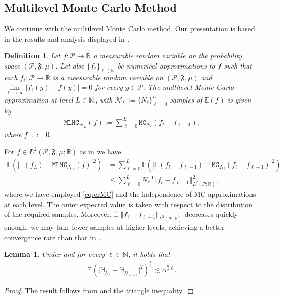 \documentclass{article}
\newtheorem{definition}[theorem]{Definition}
\newtheorem{lemma}[theorem]{Lemma}
\newcommand{\cG}{\mathcal{G}}
\newcommand{\cP}{\mathcal{P}}
\newcommand{\cN}{\mathcal{N}}
\newcommand{\fF}{\mathfrak{F}}
\newcommand{\IE}{\mathbb{E}}
\newcommand{\IH}{\mathbb{H}}
\newcommand{\IN}{\mathbb{N}}
\newcommand{\IR}{\mathbb{R}}
\newcommand{\norm}[2]{{\left\Vert #2 \right\Vert}_{#1}}
\newcommand{\abs}[1]{{\left\vert #1 \right\vert}}
\newcommand{\lp}[2]{{L}^{#1}( #2 )}
\newcommand{\probspace}{\cP, \fF, \mu}
\newcommand{\probspacepar}{(\probspace )}
\newcommand{\mc}[2]{\mathtt{MC}_{#1}{\left(#2\right)}}
\newcommand{\mlmc}[2]{\mathtt{MLMC}_{#1}{\left(#2\right)}}
\theoremstyle{definition}
\begin{document}
\subsection{Multilevel Monte Carlo Method}
We continue with the multilevel Mon\-te Carlo method. Our presentation is based in the
results and analysis displayed in \cite{barthMultilevelMonteCarlo2011,cliffeMultilevelMonteCarlo2011,
  elfversonMultilevelMonteCarlo2016,haji-aliAdaptiveMultilevelMonte2022}.
\begin{definition}
  \label{defi:MLMC}
  Let $f:\cP\to\IR$ a measurable random variable on the probability space
  $\probspacepar$. Let also $\{f_\ell\}_{\ell\in\IN}$ be numerical approximations to $f$
  such that each $f_\ell:\cP\to\IR$ is a measurable random variable on $\probspacepar$ and
  $\lim\limits_{\ell\to\infty}\abs{f_\ell(y)-f(y)}=0$ for every $y\in\cP$.
  The multilevel Monte Carlo approximation at level $L\in\IN_0$ with $\cN_L:=\{N_\ell\}_{\ell=0}^L$
  samples of $\IE(f)$ is given by
  \begin{align*}
    \mlmc{\cN_L}{f}:=\sum\limits_{\ell=0}^{L}\mc{N_\ell}{f_\ell-f_{\ell-1}},
  \end{align*}
  where $f_{-1}:=0$.
\end{definition}
For $f\in\lp{2}{\probspace;\IR}$ as in  we have
\begin{align*}
  \IE\left(\vert{\IE(f_L) - \mlmc{\cN_L}{f}\vert^{2}}\right)&=\sum\limits_{\ell=0}^{L}\IE\left(\vert{\IE\left(f_\ell-f_{\ell-1}\right)-\mc{N_\ell}{f_\ell-f_{\ell-1}}}\vert^2\right)\\
  &\leq\sum\limits_{\ell=0}^{L}N_\ell^{-1}\norm{\lp{2}{\cP;\IR}}{f_\ell-f_{\ell-1}}^2,
\end{align*}
where we have employed \eqref{eq:erMC} and the independence of MC approximations at each level. The outer expected value is taken with respect to the distribution of the required samples. Moreover, if $\norm{\lp{2}{\cP;\IR}}{f_\ell-f_{\ell-1}}$
decreases quickly enough, we may take fewer samples at higher levels, achieving a better convergence rate than that in .
\begin{lemma}
  \label{lem:l2diff}
  Under  and for every $\ell\in\IN$, it holds that
  \begin{align*}
\IE\left(\vert{\IH_{\cG_\ell}-\IH_{\cG_{\ell-1}}\vert^2}\right)^{\frac{1}{2}}\lesssim\alpha^{\frac{q}{2}\ell}.
  \end{align*}
\end{lemma}
\begin{proof}
  The result follows from  and the triangle inequality.
\end{proof}
\end{document}
